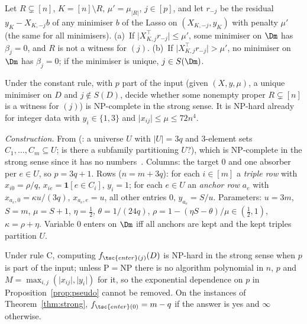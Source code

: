 \begin{lemma}\label{lem:entry-any}
Let $R\subsetneq[n]$, $K=[n]\setminus R$, $\mu'=\mu_{|R|}$, $j\in[p]$, and let $r_{-j}$ be the residual $y_K-X_{K,-j}b$ of any minimiser $b$ of the Lasso on $(X_{K,-j},y_K)$ with penalty $\mu'$ (the same for all minimisers). (a)~If $\lvert X_{K,j}^{\top}r_{-j}\rvert\le\mu'$, some minimiser on $\Dm$ has $\beta_j=0$, and $R$ is not a witness for $(j)$. (b)~If $\lvert X_{K,j}^{\top}r_{-j}\rvert>\mu'$, no minimiser on $\Dm$ has $\beta_j=0$; if the minimiser is unique, $j\in S(\Dm)$.
\end{lemma}

\begin{theorem}\label{thm:strong}
Under the constant rule,  with $p$ part of the input (given $(X,y,\mu)$, a unique minimiser on $D$ and $j\notin S(D)$, decide whether some nonempty proper $R\subsetneq[n]$ is a witness for $(j)$) is NP-complete in the strong sense. It is NP-hard already for integer data with $y_i\in\{1,3\}$ and $\lvert x_{ij}\rvert\le\mu\le 72n^4$.
\end{theorem}

\noindent\emph{Construction.} From  (: a universe $U$ with $|U|=3q$ and 3-element sets $C_1,\dots,C_m\subseteq U$; is there a subfamily partitioning $U$?), which is NP-complete in the strong sense since it has no numbers~\citep{garey1979}. Columns: the target $0$ and one absorber per $e\in U$, so $p=3q+1$. Rows ($n=m+3q$): for each $i\in[m]$ a \emph{triple row} with $x_{i0}=\rho/q$, $x_{ie}=\mathbf 1[e\in C_i]$, $y_i=1$; for each $e\in U$ an \emph{anchor row} $a_e$ with $x_{a_e,0}=\kappa u/(3q)$, $x_{a_e,e}=u$, all other entries $0$, $y_{a_e}=S/u$. Parameters: $u=3m$, $S=m$, $\mu=S+1$, $\eta=\tfrac12$, $\theta=1/(24q)$, $\rho=1-(\eta S-\theta)/\mu\in(\tfrac12,1)$, $\kappa=\rho+\eta$. Variable $0$ enters on $\Dm$ iff all anchors are kept and the kept triples partition $U$.

\begin{corollary}\label{cor:strong-f}
Under rule C, computing $f_{\tsc{enter}(j)}(D)$ is NP-hard in the strong sense when $p$ is part of the input; unless P${}={}$NP there is no algorithm polynomial in $n$, $p$ and $M=\max_{i,j}(\lvert x_{ij}\rvert,\lvert y_i\rvert)$ for it, so the exponential dependence on $p$ in Proposition~\ref{prop:pseudo} cannot be removed. On the instances of Theorem~\ref{thm:strong}, $f_{\tsc{enter}(0)}=m-q$ if the answer is yes and $\infty$ otherwise.
\end{corollary}

